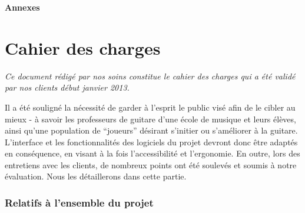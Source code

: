 \begin{titlepage}
  \begin{center}
    \vspace{8cm}
    \Huge \textbf{Annexes}
  \end{center}
\end{titlepage}

\clearpage

\section*{Cahier des charges}\label{cdc}

\textit{Ce document rédigé par nos soins constitue le cahier des charges qui a été validé par nos clients début janvier 2013.}

\vspace{1cm}

Il a été souligné la nécessité de garder à l'esprit le public visé afin de le cibler au mieux - à savoir les professeurs de guitare d'une école de musique et leurs élèves, ainsi qu'une population de ``joueurs'' désirant s'initier ou s'améliorer à la guitare. L'interface et les fonctionnalités des logiciels du projet devront donc être adaptés en conséquence, en visant à la fois l'accessibilité et l'ergonomie. En outre, lors des entretiens avec les clients, de nombreux points ont été soulevés et soumis à notre évaluation. Nous les détaillerons dans cette partie.

\subsubsection*{Relatifs à l'ensemble du projet}

